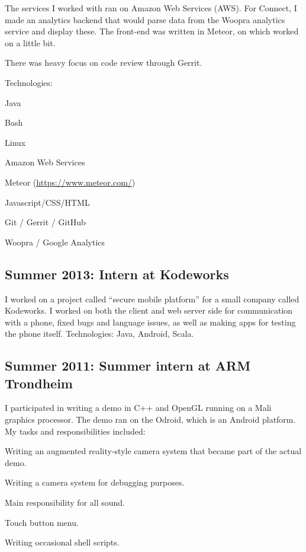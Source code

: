 \documentclass[letterpaper]{article}
\renewenvironment{itemize}{
  \begin{list}{}{
    \setlength{\leftmargin}{1.5em}
  }
}{
  \end{list}
}
\begin{document}
The services I worked with ran on Amazon Web Services (AWS). For Connect, I made an analytics backend that would parse data from the Woopra analytics service and display these. The front-end was written in Meteor, on which worked on a little bit.

There was heavy focus on code review through Gerrit.

Technologies:
\begin{itemize}
\item Java
\item Bash
\item Linux
\item Amazon Web Services
\item Meteor (\url{https://www.meteor.com/})
\item Javascript/CSS/HTML
\item Git / Gerrit / GitHub
\item Woopra / Google Analytics
\end{itemize}

\subsection*{Summer 2013: Intern at Kodeworks}
I worked on a project called ``secure mobile platform'' for a small company
called Kodeworks. I worked on both the client and web
server side for communication with a phone, fixed bugs and language
issues, as well as making apps for testing the phone itself. Technologies: Java, Android, Scala.

\subsection*{Summer 2011: Summer intern at ARM Trondheim}
I participated in writing a demo in C++ and OpenGL running on a Mali
graphics processor. The demo ran on the Odroid, which is an Android
platform.
My tasks and responsibilities included:
\begin{itemize}
\item Writing an augmented reality-style camera system that became
  part of the actual demo.
\item Writing a camera system for debugging purposes.
\item Main responsibility for all sound.
\item Touch button menu.
\item Writing occasional shell scripts.
\end{itemize}
\end{document}
